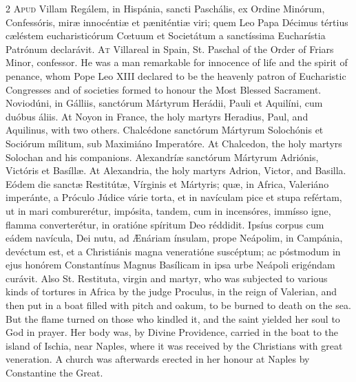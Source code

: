 \begin{paracol}{2}
\lettrine[lines=2]{A}{pud} Villam Regálem, 
 in Hispánia, sancti Paschális, ex Ordine Minórum, Confessóris, miræ 
 innocéntiæ et pæniténtiæ viri; quem Leo Papa Décimus tértius cæléstem 
 eucharisticórum Cœtuum et Societátum a sanctíssima Eucharístia Patrónum 
 declarávit.
\switchcolumn
{}
\lettrine[lines=2]{A}{t} Villareal in Spain, St. Paschal 
 of the Order of Friars Minor, confessor. He was a man remarkable for 
 innocence of life and the spirit of penance, whom Pope Leo XIII declared to 
 be the heavenly patron of Eucharistic Congresses and of societies formed to 
 honour the Most Blessed Sacrament.
\switchcolumn*
{}
Noviodúni, in Gálliis, 
 sanctórum Mártyrum Herádii, Pauli et Aquilíni, cum duóbus áliis.
\switchcolumn
{}
At Noyon in France, the holy 
 martyrs Heradius, Paul, and Aquilinus, with two others.
\switchcolumn*
{}
Chalcédone sanctórum 
 Mártyrum Solochónis et Sociórum mílitum, sub Maximiáno Imperatóre.
\switchcolumn
{}
At Chalcedon, the holy martyrs 
 Solochan and his companions.
\switchcolumn*
{}
Alexandríæ sanctórum 
 Mártyrum Adriónis, Victóris et Basíllæ.
\switchcolumn
{}
At Alexandria, the holy martyrs 
 Adrion, Victor, and Basilla.
\switchcolumn*
{}
Eódem die sanctæ 
 Restitútæ, Vírginis et Mártyris; quæ, in Africa, Valeriáno imperánte, a 
 Próculo Júdice várie torta, et in navículam pice et stupa refértam, ut in mari comburerétur, impósita, tandem, cum in incensóres, immísso igne, flamma 
 converterétur, in oratióne spíritum Deo réddidit. Ipsíus corpus cum 
 eádem navícula, Dei nutu, ad Ænáriam ínsulam, prope Neápolim, in Campánia, 
 devéctum est, et a Christiánis magna veneratióne suscéptum; ac póstmodum in 
 ejus honórem Constantínus Magnus Basílicam in ipsa urbe Neápoli erigéndam 
 curávit.
\switchcolumn
{}
Also St. Restituta, virgin and 
 martyr, who was subjected to various kinds of tortures in Africa by the 
 judge Proculus, in the reign of Valerian, and then put in a boat filled with 
 pitch and oakum, to be burned to death on the sea. But the flame 
 turned on those who kindled it, and the saint yielded her soul to God in 
 prayer. Her body was, by Divine Providence, carried in the boat to the 
 island of Ischia, near Naples, where it was received by the Christians with 
 great veneration. A church was afterwards erected in her honour at 
 Naples by Constantine the Great.
\switchcolumn*
{}
\end{paracol}


